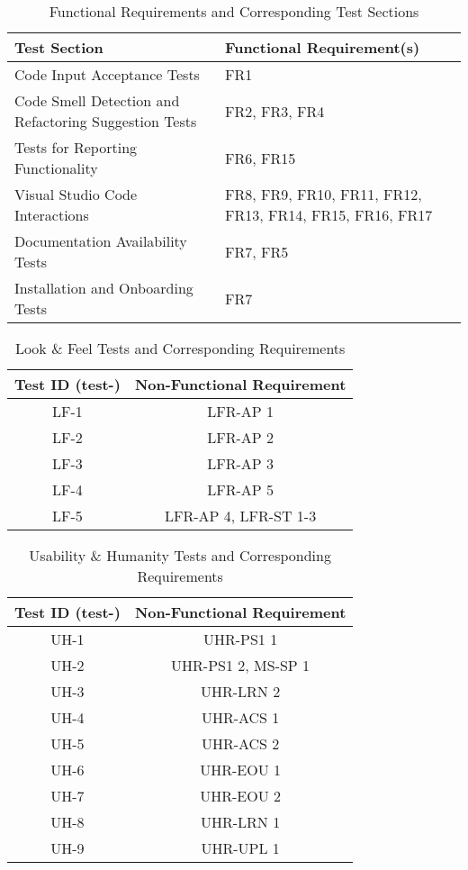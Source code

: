 \documentclass[12pt, titlepage]{article}
\begin{document}
\begin{table}[H]
  \centering
  \caption{Functional Requirements and Corresponding Test Sections}
  \begin{tabular}{p{}p{}}
    \toprule \textbf{Test Section} & \textbf{Functional Requirement(s)} \\
    \midrule
    Code Input Acceptance Tests & FR1 \\
    Code Smell Detection and Refactoring Suggestion Tests & FR2, FR3, FR4 \\
    Tests for Reporting Functionality & FR6, FR15 \\
    Visual Studio Code Interactions & FR8, FR9, FR10, FR11, FR12, FR13, FR14, FR15, FR16, FR17 \\
    Documentation Availability Tests & FR7, FR5 \\
    Installation and Onboarding Tests & FR7 \\
    \bottomrule
  \end{tabular}
  \label{tab:sections_requirements}
\end{table}


  \label{tab:nfr-trace-reqs}
  \begin{table}[H]
    \centering
    \caption{Look \& Feel Tests and Corresponding Requirements}
    \begin{tabular}{cc}
      \toprule \textbf{Test ID (test-)} & \textbf{Non-Functional Requirement} \\
      \midrule
      LF-1 & LFR-AP 1 \\
      LF-2 & LFR-AP 2 \\
      LF-3 & LFR-AP 3 \\
      LF-4 & LFR-AP 5 \\
      LF-5 & LFR-AP 4, LFR-ST 1-3 \\
      \bottomrule
    \end{tabular}
  \end{table}

  \begin{table}[H]
    \centering
    \caption{Usability \& Humanity Tests and Corresponding Requirements}
    \begin{tabular}{cc}
      \toprule \textbf{Test ID (test-)} & \textbf{Non-Functional Requirement} \\
      \midrule
      UH-1 & UHR-PS1 1 \\
      UH-2 & UHR-PS1 2, MS-SP 1 \\
      UH-3 & UHR-LRN 2 \\
      UH-4 & UHR-ACS 1 \\
      UH-5 & UHR-ACS 2 \\
      UH-6 & UHR-EOU 1 \\
      UH-7 & UHR-EOU 2 \\
      UH-8 & UHR-LRN 1 \\
      UH-9 & UHR-UPL 1 \\
      \bottomrule
    \end{tabular}
  \end{table}
\end{document}
